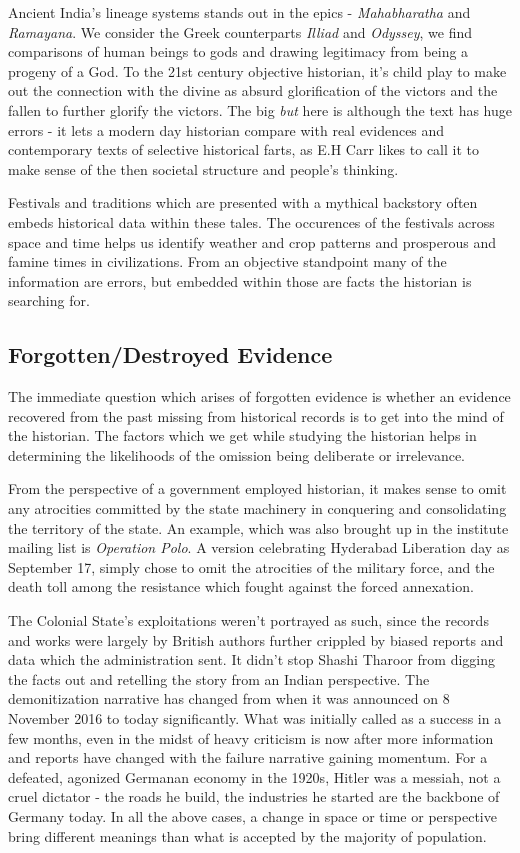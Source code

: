 \documentclass[a4paper]{article}
\begin{document}
Ancient India's lineage systems stands out in the epics -
\emph{Mahabharatha} and \emph{Ramayana}. We consider the Greek
counterparts \emph{Illiad} and \emph{Odyssey}, we find comparisons of
human beings to gods and drawing legitimacy from being a progeny of a
God. To the 21st century objective historian, it's child play to make
out the connection with the divine as absurd glorification of the
victors and the fallen to further glorify the victors. The big
\emph{but} here is although the text has huge errors - it lets a modern
day historian compare with real evidences and contemporary texts of
selective historical farts, as E.H Carr likes to call it\cite[p.
13]{carr1961history} to make sense of the then societal structure and
people's thinking.

Festivals and traditions which are presented with a mythical backstory
often embeds historical data within these tales. The occurences of the
festivals across space and time helps us identify weather and crop
patterns and prosperous and famine times in civilizations. From an
objective standpoint many of the information are errors, but embedded
within those are facts the historian is searching for. 


\subsection{Forgotten/Destroyed Evidence}

The immediate question which arises of forgotten evidence is whether an
evidence recovered from the past missing from historical records is to
get into the mind of the historian. The factors which we get while
studying the historian helps in determining the likelihoods of the
omission being deliberate or irrelevance.

From the perspective of a government employed historian, it makes sense
to omit any atrocities committed by the state machinery in conquering
and consolidating the territory of the state. An example, which was also
brought up in the institute mailing list is \emph{Operation Polo}. A
version celebrating Hyderabad Liberation day as September 17, simply
chose to omit the atrocities of the military force, and the death toll
among the resistance which fought against the forced annexation.

The Colonial State's exploitations weren't portrayed as such, since the
records and works were largely by British authors further crippled by
biased reports and data which the administration sent. It didn't stop
Shashi Tharoor from digging the facts out and retelling the story from
an Indian perspective.  The demonitization narrative has changed from
when it was announced on 8 November 2016 to today significantly. What
was initially called as a success in a few months, even in the midst of
heavy criticism is now after more information and reports have changed
with the failure narrative gaining momentum.  For a defeated, agonized
Germanan economy in the 1920s, Hitler was a messiah, not a cruel
dictator - the roads he build, the industries he started are the
backbone of Germany today. In all the above cases, a change in space or
time or perspective bring different meanings than what is accepted by
the majority of population.
\end{document}
